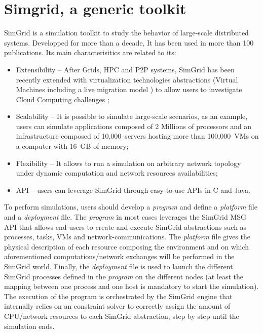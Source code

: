 \documentclass[conference]{IEEEtran}
\newcommand{\sg}{SimGrid\xspace}
\begin{document}
\section{Simgrid, a generic toolkit}
\label{sec:sg}

\sg is a simulation toolkit to study the behavior of
large-scale distributed systems.  Developped for more than  a decade, It has been used in more than 100
publications.  Its main characterisitics are related to its:
\begin{itemize}
\item Extensibility -- After Grids, HPC and P2P
  systems, \sg has been recently extended with virtualization technologies abstractions
(\ie Virtual Machines including a live migration model \cite{Hirofuchi:2013:ALM:2568486.2568524}) to allow users to investigate Cloud
Computing challenges \cite{lucas:cloud2014};
\item Scalability -- It is possible to simulate large-scale scenarios,
  as an example, users can simulate applications composed of 2
  Millions of processors and an infrastructure composed of 10,000~servers hosting more than
  100,000~VMs on a computer with 16~GB of memory;
\item  Flexibility -- It allows to run a simulation on arbitrary network
  topology under dynamic computation and network resources
  availabilities;
\item API --  users can leverage \sg through easy-to-use APIs in C
  and Java.
\end{itemize}

To perform simulations, users should develop a \emph{program} and
define a \emph{platform} file and a \emph{deployment} file. The
\emph{program} in most cases leverages the \sg MSG API that allows
end-users to create and execute \sg abstractions such as processes,
tasks, VMs and network-communications. The \emph{platform} file gives
the physical description of each resource composing the environment
and on which aforementioned computations/network exchanges will be
performed in the \sg
world.
Finally, the \emph{deployment} file is used to launch the different
\sg processes defined in the \emph{program} on the different nodes (at
least the mapping between one process and one host is mandatory to
start the simulation). The execution of the program is orchestrated by
the \sg engine that internally relies on an constraint solver to
correctly assign the amount of CPU/network resources to each \sg
abstraction, step by step until the simulation ends.
\end{document}
